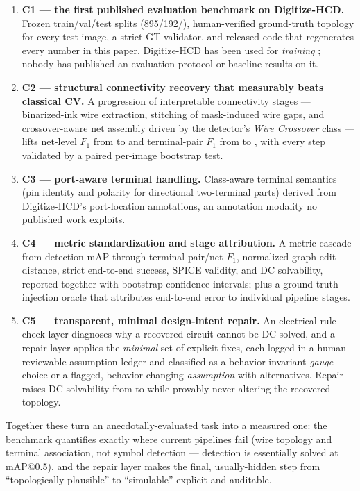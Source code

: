 \begin{enumerate}
  \item \textbf{C1 — the first published evaluation benchmark on
  Digitize-HCD.} Frozen train/val/test splits (895/192/\NumTestImages),
  human-verified ground-truth topology for every test image, a strict
  GT validator, and released code that regenerates every number in
  this paper. Digitize-HCD has been used for \emph{training}
  \cite{wang2026topology}; nobody has published an evaluation protocol
  or baseline results on it.

  \item \textbf{C2 — structural connectivity recovery that measurably
  beats classical CV.} A progression of interpretable connectivity
  stages — binarized-ink wire extraction, stitching of mask-induced
  wire gaps, and crossover-aware net assembly driven by the detector's
  \emph{Wire Crossover} class — lifts net-level $F_1$ from
  \AblNetFOneClassical{} to \AblNetFOneVFive{} and terminal-pair $F_1$
  from \AblTpFOneClassical{} to \AblTpFOneVFive{}, with every step
  validated by a paired per-image bootstrap test.

  \item \textbf{C3 — port-aware terminal handling.} Class-aware
  terminal semantics (pin identity and polarity for directional
  two-terminal parts) derived from Digitize-HCD's port-location
  annotations, an annotation modality no published work exploits.

  \item \textbf{C4 — metric standardization and stage attribution.} A
  metric cascade from detection mAP through terminal-pair/net $F_1$,
  normalized graph edit distance, strict end-to-end success, SPICE
  validity, and DC solvability, reported together with bootstrap
  confidence intervals; plus a ground-truth-injection oracle that
  attributes end-to-end error to individual pipeline stages.

  \item \textbf{C5 — transparent, minimal design-intent repair.} An
  electrical-rule-check layer diagnoses why a recovered circuit cannot
  be DC-solved, and a repair layer applies the \emph{minimal} set of
  explicit fixes, each logged in a human-reviewable assumption ledger
  and classified as a behavior-invariant \emph{gauge} choice or a
  flagged, behavior-changing \emph{assumption} with alternatives.
  Repair raises DC solvability from \RepSolvBefore{} to
  \RepSolvAfter{} while provably never altering the recovered
  topology.
\end{enumerate}

Together these turn an anecdotally-evaluated task into a measured one:
the benchmark quantifies exactly where current pipelines fail (wire
topology and terminal association, not symbol detection — detection is
essentially solved at \DetMapFifty{} mAP@0.5), and the repair layer
makes the final, usually-hidden step from ``topologically plausible''
to ``simulable'' explicit and auditable.

